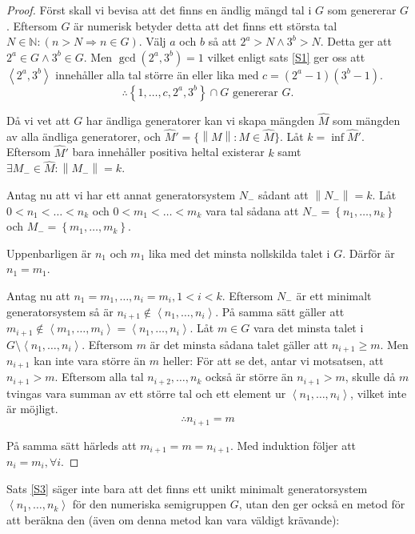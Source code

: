 \begin{proof}
Först skall vi bevisa att det finns en ändlig mängd tal i $G$ som genererar $G$. Eftersom $G$ är numerisk betyder detta att det finns ett största tal $N \in \mathbb{N} : (n > N \Longrightarrow n \in G)$. Välj $a$ och $b$ så att $2^a > N \wedge 3^b > N$. Detta ger att $2^a \in G \wedge 3^b \in G$. Men $\gcd(2^a, 3^b) = 1$ vilket enligt sats \ref{S1} ger oss att $\left<2^a, 3^b\right>$ innehåller alla tal större än eller lika med $c = (2^a - 1)(3^b - 1)$.
\[\therefore \left\{1, \ldots, c, 2^a, 3^b\right\} \cap G \text{ genererar } G\text{.}\]

Då vi vet att $G$ har ändliga generatorer kan vi skapa mängden $\widehat{M}$ som mängden av alla ändliga generatorer, och $\widehat{M}' = \{ \left\|M\right\| : M \in \widehat{M}\}$. Låt $k = \inf \widehat{M}'$. Eftersom $\widehat{M}'$ bara innehåller positiva heltal existerar $k$ samt $\exists M_- \in \widehat{M} : \left\|M_-\right\|=k$.

Antag nu att vi har ett annat generatorsystem $N_-$ sådant att $\left\|N_-\right\| = k$. Låt $0 < n_1 < \ldots< n_k$ och $0 < m_1 < \ldots< m_k$ vara tal sådana att $N_-= \left\{n_1, \ldots, n_k\right\}$ och $M_- = \left\{m_1, \ldots, m_k\right\}$.

Uppenbarligen är $n_1$ och $m_1$ lika med det minsta nollskilda talet i $G$. Därför är $n_1 = m_1$.

Antag nu att $n_1 = m_1, \ldots, n_i = m_i, 1 < i < k$. Eftersom $N_-$ är ett minimalt generatorsystem så är $n_{i+1} \notin \left<n_1, \ldots, n_i\right>$. På samma sätt gäller att $m_{i+1} \notin \left<m_1, \ldots, m_i\right> = \left<n_1, \ldots, n_i\right>$. Låt $m \in G$ vara det minsta talet i $G \setminus \left<n_1, \ldots, n_i\right>$. Eftersom $m$ är det minsta sådana talet gäller att $n_{i+1} \geq m$. Men $n_{i+1}$ kan inte vara större än $m$ heller: För att se det, antar vi motsatsen, att $n_{i+1}>m$. Eftersom alla tal $n_{i+2}, \ldots, n_k$ också är större än $n_{i+1} > m$, skulle då $m$ tvingas vara summan av ett större tal och ett element ur $\left<n_1, \ldots, n_i\right>$, vilket inte är möjligt.
\[\therefore n_{i+1} = m\]

På samma sätt härleds att $m_{i+1} = m = n_{i+1}$. Med induktion följer att $n_i = m_i, \forall i$.
\end{proof}

Sats \ref{S3} säger inte bara att det finns ett unikt minimalt generatorsystem $\left<n_1, \ldots, n_k\right>$ för den numeriska semigruppen $G$, utan den ger också en metod för att beräkna den (även om denna metod kan vara väldigt krävande):

